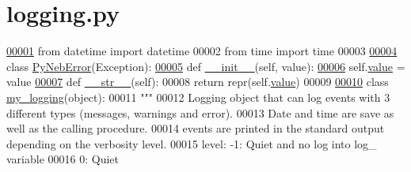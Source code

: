 \hypertarget{logging_8py_source}{}\section{logging.\+py}
\label{logging_8py_source}

\begin{DoxyCode}
\hypertarget{logging_8py_source_l00001}{}\hyperlink{namespacepyneb_1_1utils_1_1logging}{00001} \textcolor{keyword}{from} datetime \textcolor{keyword}{import} datetime
00002 \textcolor{keyword}{from} time \textcolor{keyword}{import} time
00003 
\hypertarget{logging_8py_source_l00004}{}\hyperlink{classpyneb_1_1utils_1_1logging_1_1_py_neb_error}{00004} \textcolor{keyword}{class }\hyperlink{classpyneb_1_1utils_1_1logging_1_1_py_neb_error}{PyNebError}(Exception):
\hypertarget{logging_8py_source_l00005}{}\hyperlink{classpyneb_1_1utils_1_1logging_1_1_py_neb_error_a7b1aefe3380cb0c4e0bc1e964f9f326f}{00005}     \textcolor{keyword}{def }\hyperlink{classpyneb_1_1utils_1_1logging_1_1_py_neb_error_a7b1aefe3380cb0c4e0bc1e964f9f326f}{\_\_init\_\_}(self, value):
\hypertarget{logging_8py_source_l00006}{}\hyperlink{classpyneb_1_1utils_1_1logging_1_1_py_neb_error_aec64ebee7cc44f3c40b15959cfeb2efb}{00006}         self.\hyperlink{classpyneb_1_1utils_1_1logging_1_1_py_neb_error_aec64ebee7cc44f3c40b15959cfeb2efb}{value} = value
\hypertarget{logging_8py_source_l00007}{}\hyperlink{classpyneb_1_1utils_1_1logging_1_1_py_neb_error_a5679076c6188021f71aeffa2caee4fd3}{00007}     \textcolor{keyword}{def }\hyperlink{classpyneb_1_1utils_1_1logging_1_1_py_neb_error_a5679076c6188021f71aeffa2caee4fd3}{\_\_str\_\_}(self):
00008         \textcolor{keywordflow}{return} repr(self.\hyperlink{classpyneb_1_1utils_1_1logging_1_1_py_neb_error_aec64ebee7cc44f3c40b15959cfeb2efb}{value})    
00009     
\hypertarget{logging_8py_source_l00010}{}\hyperlink{classpyneb_1_1utils_1_1logging_1_1my__logging}{00010} \textcolor{keyword}{class }\hyperlink{classpyneb_1_1utils_1_1logging_1_1my__logging}{my\_logging}(object):
00011     \textcolor{stringliteral}{"""}
00012 \textcolor{stringliteral}{    Logging object that can log events with 3 different types (messages, warnings and error).}
00013 \textcolor{stringliteral}{    Date and time are save as well as the calling procedure.}
00014 \textcolor{stringliteral}{    events are printed in the standard output depending on the verbosity level.}
00015 \textcolor{stringliteral}{    level: -1: Quiet and no log into log\_ variable}
00016 \textcolor{stringliteral}{             0: Quiet}

\end{DoxyCode}
